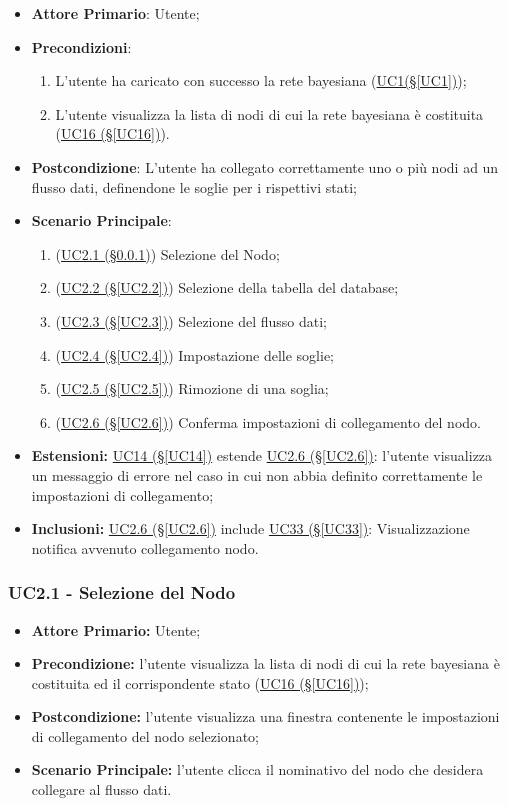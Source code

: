 \begin{itemize}
\item \textbf{Attore Primario}: Utente;
\item \textbf{Precondizioni}:
\begin{enumerate}
	\item L'utente ha caricato con successo la rete bayesiana (\hyperref[UC1]{UC1(§\ref*{UC1})});
	\item L'utente visualizza la lista di nodi di cui la rete bayesiana è costituita	(\hyperref[UC16]{UC16 (§\ref*{UC16})}).
\end{enumerate}
\item \textbf{Postcondizione}: L'utente ha collegato correttamente uno o più nodi ad un flusso dati, definendone le soglie per i rispettivi stati;
\item \textbf{Scenario Principale}:
 \begin{enumerate}
 \item (\hyperref[UC2.1]{UC2.1 (§\ref*{UC2.1})}) Selezione del Nodo;
 \item (\hyperref[UC2.2]{UC2.2 (§\ref*{UC2.2})}) Selezione della tabella del database;
 \item (\hyperref[UC2.3]{UC2.3 (§\ref*{UC2.3})}) Selezione del flusso dati;
 \item (\hyperref[UC2.4]{UC2.4 (§\ref*{UC2.4})}) Impostazione delle soglie;
 \item (\hyperref[UC2.5]{UC2.5 (§\ref*{UC2.5})}) Rimozione di una soglia;
 \item (\hyperref[UC2.6]{UC2.6 (§\ref*{UC2.6})}) Conferma impostazioni di collegamento del nodo.
 \end{enumerate}
\item \textbf{Estensioni:} \hyperref[UC14]{UC14 (§\ref*{UC14})} estende \hyperref[UC2.6]{UC2.6 (§\ref*{UC2.6})}: l'utente visualizza un messaggio di errore nel caso in cui non abbia definito correttamente le impostazioni di collegamento;
\item \textbf{Inclusioni:} \hyperref[UC2.6]{UC2.6 (§\ref*{UC2.6})} include \hyperref[UC33]{UC33 (§\ref*{UC33})}: Visualizzazione notifica avvenuto collegamento nodo.
\end{itemize}

\pagebreak

\subsubsection{UC2.1 - Selezione del Nodo}\label{UC2.1}
\begin{itemize}
\item \textbf{Attore Primario:} Utente;
\item \textbf{Precondizione:} l'utente visualizza la lista di nodi di cui la rete bayesiana è costituita ed il 	corrispondente stato (\hyperref[UC16]{UC16 (§\ref*{UC16})});
\item \textbf{Postcondizione:} l'utente visualizza una finestra contenente le impostazioni di collegamento del nodo selezionato;
\item \textbf{Scenario Principale:} l'utente clicca il nominativo del nodo che desidera collegare al flusso dati.
\end{itemize}

